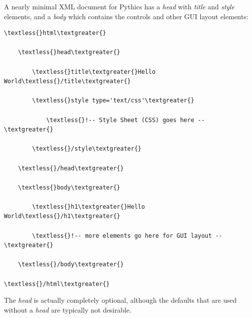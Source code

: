 \documentclass[letterpaper,10pt,english]{sphinxmanual}
\begin{document}
A nearly minimal XML document for Pythics has a \emph{head} with \emph{title} and \emph{style}
elements, and a \emph{body} which contains the controls and other GUI layout
elements:

\begin{Verbatim}[commandchars=\\\{\}]
\textless{}html\textgreater{}

    \textless{}head\textgreater{}

        \textless{}title\textgreater{}Hello World\textless{}/title\textgreater{}

        \textless{}style type='text/css'\textgreater{}

            \textless{}!-- Style Sheet (CSS) goes here --\textgreater{}

        \textless{}/style\textgreater{}

    \textless{}/head\textgreater{}

    \textless{}body\textgreater{}

        \textless{}h1\textgreater{}Hello World\textless{}/h1\textgreater{}

        \textless{}!-- more elements go here for GUI layout --\textgreater{}

    \textless{}/body\textgreater{}

\textless{}/html\textgreater{}
\end{Verbatim}

The \emph{head} is actually completely optional, although the defaults that are used
without a \emph{head} are typically not desirable.
\end{document}
